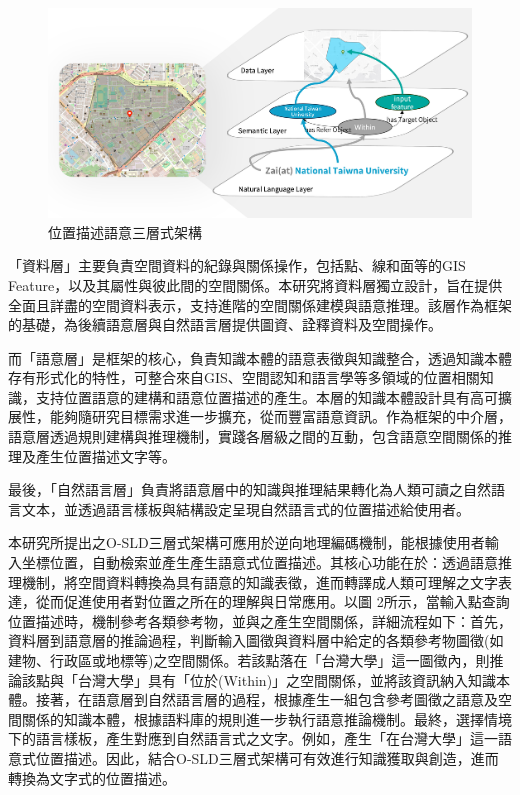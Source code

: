 \begin{figure}[!htbp]
\centering
\includegraphics[width = \textwidth]{figures/three-layered.png}
\caption{位置描述語意三層式架構}
\label{fig:three-layered}
\end{figure}

「資料層」主要負責空間資料的紀錄與關係操作，包括點、線和面等的GIS Feature，以及其屬性與彼此間的空間關係。本研究將資料層獨立設計，旨在提供全面且詳盡的空間資料表示，支持進階的空間關係建模與語意推理。該層作為框架的基礎，為後續語意層與自然語言層提供圖資、詮釋資料及空間操作。

而「語意層」是框架的核心，負責知識本體的語意表徵與知識整合，透過知識本體存有形式化的特性，可整合來自GIS、空間認知和語言學等多領域的位置相關知識，支持位置語意的建構和語意位置描述的產生。本層的知識本體設計具有高可擴展性，能夠隨研究目標需求進一步擴充，從而豐富語意資訊。作為框架的中介層，語意層透過規則建構與推理機制，實踐各層級之間的互動，包含語意空間關係的推理及產生位置描述文字等。

最後，「自然語言層」負責將語意層中的知識與推理結果轉化為人類可讀之自然語言文本，並透過語言樣板與結構設定呈現自然語言式的位置描述給使用者。

本研究所提出之O-SLD三層式架構可應用於逆向地理編碼機制，能根據使用者輸入坐標位置，自動檢索並產生產生語意式位置描述。其核心功能在於：透過語意推理機制，將空間資料轉換為具有語意的知識表徵，進而轉譯成人類可理解之文字表達，從而促進使用者對位置之所在的理解與日常應用。以圖 2所示，當輸入點查詢位置描述時，機制參考各類參考物，並與之產生空間關係，詳細流程如下：首先，資料層到語意層的推論過程，判斷輸入圖徵與資料層中給定的各類參考物圖徵(如建物、行政區或地標等)之空間關係。若該點落在「台灣大學」這一圖徵內，則推論該點與「台灣大學」具有「位於(Within)」之空間關係，並將該資訊納入知識本體。接著，在語意層到自然語言層的過程，根據產生一組包含參考圖徵之語意及空間關係的知識本體，根據語料庫的規則進一步執行語意推論機制。最終，選擇情境下的語言樣板，產生對應到自然語言式之文字。例如，產生「在台灣大學」這一語意式位置描述。因此，結合O-SLD三層式架構可有效進行知識獲取與創造，進而轉換為文字式的位置描述。

